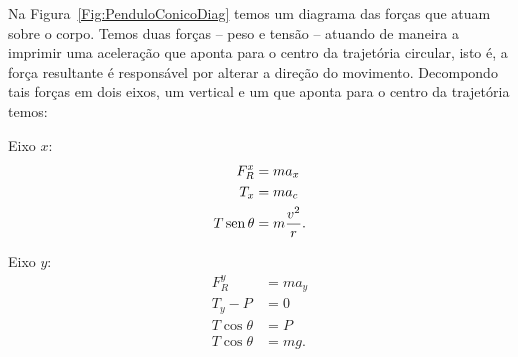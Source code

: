 Na Figura~\ref{Fig:PenduloConicoDiag} temos um diagrama das forças que atuam sobre o corpo. Temos duas forças -- peso e tensão -- atuando de maneira a imprimir uma aceleração que aponta para o centro da trajetória circular, isto é, a força resultante é responsável por alterar a direção do movimento. Decompondo tais forças em dois eixos, um vertical e um que aponta para o centro da trajetória temos:

\begin{description}
    \item{Eixo $x$:}
        \begin{align}
            F_R^x &= m a_x \\
            T_x &= m a_c \\
            T \operatorname{sen}\theta &= m \frac{v^2}{r}.
        \end{align} 
    \item{Eixo $y$:}
        \begin{align}
            F_R^y &= m a_y \\
            T_y - P &= 0 \\
            T \cos\theta &= P \\
            T \cos\theta &= mg.
        \end{align}
\end{description}

